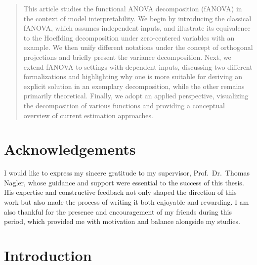 \documentclass[12pt]{article}
\begin{document}
\begin{abstract}

This article studies the functional ANOVA decomposition (fANOVA) in the context of model interpretability.
We begin by introducing the classical fANOVA, which assumes independent inputs, and illustrate its equivalence to the Hoeffding decomposition under zero-centered variables with an example. We then unify different notations under the concept of orthogonal projections and briefly present the variance decomposition. Next, we extend fANOVA to settings with dependent inputs, discussing two different formalizations and highlighting why one is more suitable for deriving an explicit solution in an exemplary decomposition, while the other remains primarily theoretical. Finally, we adopt an applied perspective, visualizing the decomposition of various functions and providing a conceptual overview of current estimation approaches.
\end{abstract}

\newpage

\section*{Acknowledgements}

I would like to express my sincere gratitude to my supervisor, Prof.\ Dr.\ Thomas Nagler, whose guidance and support were essential to the success of this thesis. 
His expertise and constructive feedback not only shaped the direction of this work but also made the process of writing it both enjoyable and rewarding.
I am also thankful for the presence and encouragement of my friends during this period, which provided me with motivation and balance alongside my studies.
\newpage


\tableofcontents

\newpage
\listoffigures
\newpage



\section{Introduction}\label{sec:intro}

\newpage

% 
\end{document}
